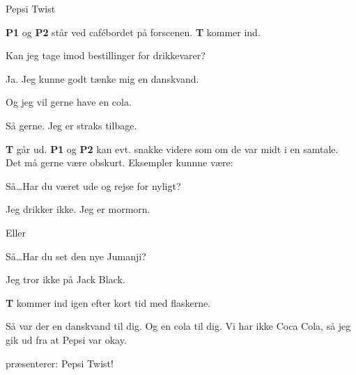 \begin{Sketch}{Pepsi Twist}
	
	\begin{Regi}
		\textbf{P1} og \textbf{P2} står ved cafébordet på forscenen. \textbf{T} kommer ind.
	\end{Regi}
	
	\begin{Replik}[T]
		Kan jeg tage imod bestillinger for drikkevarer?
	\end{Replik}
	
	\begin{Replik}[P1]
		Ja. Jeg kunne godt tænke mig en danskvand.
	\end{Replik}
	
	\begin{Replik}[P2]
		Og jeg vil gerne have en cola.
	\end{Replik}
	
	\begin{Replik}[T]
		Så gerne. Jeg er straks tilbage.
	\end{Replik}
	
	\begin{Regi}
		\textbf{T} går ud. \textbf{P1} og \textbf{P2} kan evt. snakke videre som om de var midt i en samtale. Det må gerne være obskurt. Eksempler kunnne være:
	\end{Regi}
	
	\begin{Replik}[P1]
		Så\dots Har du været ude og rejse for nyligt?
	\end{Replik}
	
	\begin{Replik}[P2]
		Jeg drikker ikke. Jeg er mormorn.
	\end{Replik}
	
	\begin{Regi}
		Eller
	\end{Regi}
	
	\begin{Replik}[P1]
		Så\dots Har du set den nye Jumanji?
	\end{Replik}
	
	\begin{Replik}[P2]
		Jeg tror ikke på Jack Black.
	\end{Replik}
	
	\begin{Regi}
		\textbf{T} kommer ind igen efter kort tid med flaskerne.
	\end{Regi}
	
	\begin{Replik}[T]
		Så var der en danskvand til dig. Og en cola til dig. Vi har ikke Coca Cola, så jeg gik ud fra at Pepsi var okay. 
	\end{Replik}
	
	\begin{Replik}[S]
		\TKET præsenterer: Pepsi Twist!
	\end{Replik}
	
\end{Sketch}


